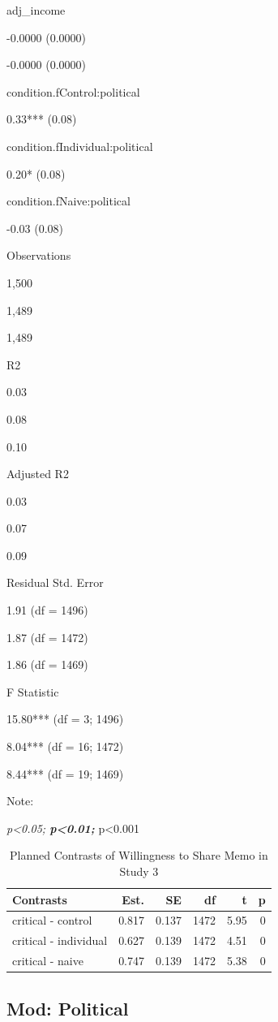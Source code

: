 \documentclass[
]{book}
\begin{document}
adj\_income

-0.0000 (0.0000)

-0.0000 (0.0000)

condition.fControl:political

0.33*** (0.08)

condition.fIndividual:political

0.20* (0.08)

condition.fNaive:political

-0.03 (0.08)

Observations

1,500

1,489

1,489

R2

0.03

0.08

0.10

Adjusted R2

0.03

0.07

0.09

Residual Std. Error

1.91 (df = 1496)

1.87 (df = 1472)

1.86 (df = 1469)

F Statistic

15.80*** (df = 3; 1496)

8.04*** (df = 16; 1472)

8.44*** (df = 19; 1469)

Note:

\emph{p\textless0.05; \textbf{p\textless0.01; }}p\textless0.001

\begin{table}

\caption{\label{tab:share-contrast-s3}Planned Contrasts of Willingness to Share Memo in Study 3}
\centering
\fontsize{13}{15}\selectfont
\begin{tabular}[t]{lrrrrr}
\toprule
Contrasts & Est. & SE & df & t & p\\
\midrule
critical - control & 0.817 & 0.137 & 1472 & 5.95 & 0\\
critical - individual & 0.627 & 0.139 & 1472 & 4.51 & 0\\
critical - naive & 0.747 & 0.139 & 1472 & 5.38 & 0\\
\bottomrule
\end{tabular}
\end{table}

\hypertarget{mod-political-17}{%
\subsection{Mod: Political}\label{mod-political-17}}
\end{document}
